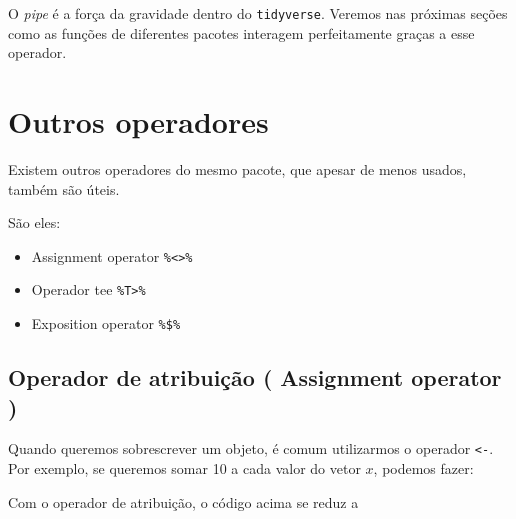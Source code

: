 \documentclass[]{book}
\newenvironment{Shaded}{\begin{snugshade}}{\end{snugshade}}
\newcommand{\CommentTok}[1]{\textcolor[rgb]{0.56,0.35,0.01}{\textit{#1}}}
\newcommand{\DecValTok}[1]{\textcolor[rgb]{0.00,0.00,0.81}{#1}}
\newcommand{\KeywordTok}[1]{\textcolor[rgb]{0.13,0.29,0.53}{\textbf{#1}}}
\newcommand{\NormalTok}[1]{#1}
\newcommand{\OperatorTok}[1]{\textcolor[rgb]{0.81,0.36,0.00}{\textbf{#1}}}
\newcommand{\StringTok}[1]{\textcolor[rgb]{0.31,0.60,0.02}{#1}}
\begin{document}
O \emph{pipe} é a força da gravidade dentro do \texttt{tidyverse}. Veremos nas próximas seções como as funções de diferentes pacotes interagem perfeitamente graças a esse operador.

\hypertarget{outros-operadores}{%
\section{Outros operadores}\label{outros-operadores}}

Existem outros operadores do mesmo pacote, que apesar de menos usados, também são úteis.

São eles:

\begin{itemize}
\item
  Assignment operator \texttt{\%\textless{}\textgreater{}\%}
\item
  Operador tee \texttt{\%T\textgreater{}\%}
\item
  Exposition operator \texttt{\%\$\%}
\end{itemize}

\hypertarget{operador-de-atribuiuxe7uxe3o-assignment-operator}{%
\subsection{Operador de atribuição ( Assignment operator )}\label{operador-de-atribuiuxe7uxe3o-assignment-operator}}

Quando queremos sobrescrever um objeto, é comum utilizarmos o operador \texttt{\textless{}-}. Por exemplo, se queremos somar 10 a cada valor do vetor \(x\), podemos fazer:

\begin{Shaded}
\end{Shaded}

Com o operador de atribuição, o código acima se reduz a

\begin{Shaded}
\end{Shaded}
\end{document}
